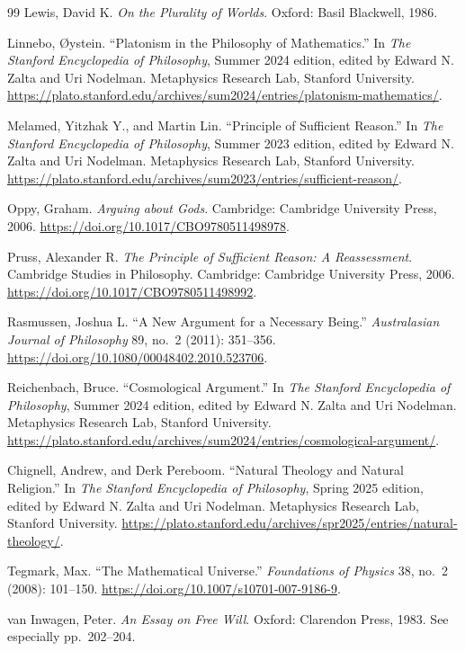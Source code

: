 \documentclass[11pt,letterpaper]{article}
\theoremstyle{plain}
\theoremstyle{definition}
\begin{document}
\begin{thebibliography}{99}
Lewis, David K. \emph{On the Plurality of Worlds}. Oxford: Basil Blackwell, 1986.

Linnebo, Øystein. ``Platonism in the Philosophy of Mathematics.'' In \emph{The Stanford Encyclopedia of Philosophy}, Summer 2024 edition, edited by Edward N. Zalta and Uri Nodelman. Metaphysics Research Lab, Stanford University. \url{https://plato.stanford.edu/archives/sum2024/entries/platonism-mathematics/}.

Melamed, Yitzhak Y., and Martin Lin. ``Principle of Sufficient Reason.'' In \emph{The Stanford Encyclopedia of Philosophy}, Summer 2023 edition, edited by Edward N. Zalta and Uri Nodelman. Metaphysics Research Lab, Stanford University. \url{https://plato.stanford.edu/archives/sum2023/entries/sufficient-reason/}.

Oppy, Graham. \emph{Arguing about Gods}. Cambridge: Cambridge University Press, 2006. \url{https://doi.org/10.1017/CBO9780511498978}.

Pruss, Alexander R. \emph{The Principle of Sufficient Reason: A Reassessment}. Cambridge Studies in Philosophy. Cambridge: Cambridge University Press, 2006. \url{https://doi.org/10.1017/CBO9780511498992}.

Rasmussen, Joshua L. ``A New Argument for a Necessary Being.'' \emph{Australasian Journal of Philosophy} 89, no.~2 (2011): 351--356. \url{https://doi.org/10.1080/00048402.2010.523706}.

Reichenbach, Bruce. ``Cosmological Argument.'' In \emph{The Stanford Encyclopedia of Philosophy}, Summer 2024 edition, edited by Edward N. Zalta and Uri Nodelman. Metaphysics Research Lab, Stanford University. \url{https://plato.stanford.edu/archives/sum2024/entries/cosmological-argument/}.

Chignell, Andrew, and Derk Pereboom. ``Natural Theology and Natural Religion.'' In \emph{The Stanford Encyclopedia of Philosophy}, Spring 2025 edition, edited by Edward N. Zalta and Uri Nodelman. Metaphysics Research Lab, Stanford University. \url{https://plato.stanford.edu/archives/spr2025/entries/natural-theology/}.

Tegmark, Max. ``The Mathematical Universe.'' \emph{Foundations of Physics} 38, no.~2 (2008): 101--150. \url{https://doi.org/10.1007/s10701-007-9186-9}.

van Inwagen, Peter. \emph{An Essay on Free Will}. Oxford: Clarendon Press, 1983. See especially pp.~202--204.


\end{thebibliography}
\end{document}
